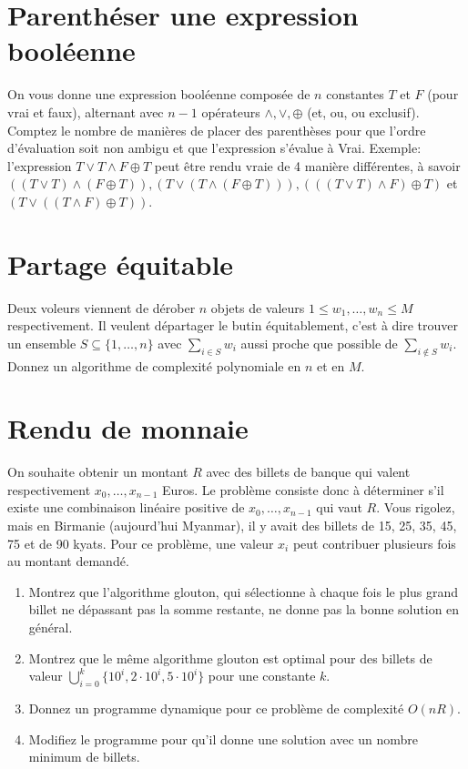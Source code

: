 \documentclass[12pt]{article}
\begin{document}
\section{Parenthéser une expression booléenne}

On vous donne une expression booléenne composée de $n$ constantes $T$ et $F$ (pour vrai et faux), alternant avec $n-1$ opérateurs $\wedge,\vee,\oplus$ (et, ou, ou exclusif).  Comptez le nombre de manières de placer des parenthèses pour que l'ordre d'évaluation soit non ambigu et que l'expression s'évalue à Vrai.  Exemple: l'expression  $T \vee T \wedge F \oplus T$ peut être rendu vraie de 4 manière différentes, à savoir
$((T\vee T)\wedge (F\oplus  T)), (T\vee (T\wedge (F\oplus  T))), (((T\vee T)\wedge F)\oplus  T)$
et $(T\vee ((T\wedge F)\oplus  T))$.

\section{Partage équitable}

Deux voleurs viennent de dérober $n$ objets de valeurs $1\leq w_1,\ldots,w_n \leq M$ respectivement.  Il veulent départager le butin équitablement, c'est à dire trouver un ensemble $S\subseteq \{1,\ldots,n\}$ avec $\sum_{i\in S} w_i$ aussi proche que possible de $\sum_{i\notin S} w_i$.
Donnez un algorithme de complexité polynomiale en $n$ et en $M$.

\section{Rendu de monnaie}


On souhaite obtenir un
montant $R$ avec des billets de banque qui valent respectivement
$x_0,\ldots,x_{n-1}$ Euros. Le problème consiste donc à déterminer s'il existe une combinaison linéaire
positive de $x_0,\ldots,x_{n-1}$ qui vaut $R$. Vous rigolez, mais en Birmanie (aujourd'hui Myanmar), il y
avait des billets de 15, 25, 35, 45, 75 et de 90 kyats.
Pour ce problème, une valeur $x_i$ peut
contribuer plusieurs fois au montant demandé.

\begin{enumerate}
    \item Montrez que l'algorithme glouton, qui sélectionne à chaque fois le plus grand billet ne dépassant pas la somme restante, ne donne pas la bonne solution en général.
\item
Montrez que le même algorithme glouton est optimal pour des billets de valeur $\bigcup_{i=0}^k \{10^i, 2\cdot 10^i, 5\cdot 10^i\}$ pour une constante $k$.
\item
Donnez un programme dynamique pour ce problème de complexité $O(nR)$.
\item
Modifiez le programme pour qu'il donne une solution avec un nombre minimum de billets.
\end{enumerate}
\end{document}
